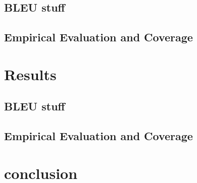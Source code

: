 \documentclass[11pt]{article}
\begin{document}
\subsection{BLEU stuff}

\subsection{Empirical Evaluation and Coverage}
\label{eval}

\section{Results}

\subsection{BLEU stuff}

\subsection{Empirical Evaluation and Coverage}

\section{conclusion}

\end{document}
